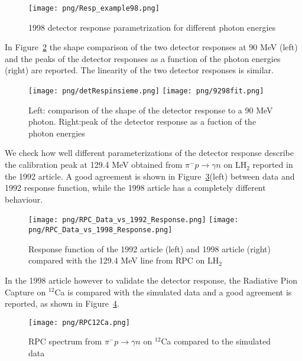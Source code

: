 \begin{figure}[!h]
\centering
\texttt{[image: png/Resp\_example98.png]}
\caption{1998 detector response parametrization for different photon energies}
\label{fig:response98}
\end{figure}

In Figure~\ref{fig:shapecomp} the shape comparison of the two detector responses at 90 MeV (left) and the peaks of the detector responses as a function of the photon energies (right) are reported. The linearity of the two detector responses is similar.

\begin{figure} [!h]
\centering
\texttt{[image: png/detRespinsieme.png]}
\texttt{[image: png/9298fit.png]}
\caption{Left: comparison of the shape of the detector response to a 90 MeV photon. Right:peak of the detector response as a fuction of the photon energies }
\label{fig:shapecomp} 
\end{figure}

We check how well different parameterizations of the detector response describe the 
calibration peak at 129.4 MeV obtained from $\pi^{-}p \rightarrow \gamma n$ on LH$_{2}$ reported in the 1992 article.
A good agreement is shown in Figure~\ref{p004}(left) between data and  1992 response function, while the 1998 article has a completely different behaviour.\\

\begin{figure}[!h]
 \begin{center}
 \texttt{[image: png/RPC\_Data\_vs\_1992\_Response.png]} 
 \texttt{[image: png/RPC\_Data\_vs\_1998\_Response.png]} 
 \end{center}
 \caption{Response function of the 1992 article (left) and 1998 article (right) compared with the 129.4 MeV line from RPC on LH$_{2}$}
 \label{p004}
 \end{figure}

 In the 1998 article  however to validate  the detector response, the Radiative Pion Capture on $^{12}$Ca  is compared with the simulated data and a good agreement is reported, as shown in Figure~\ref{fig:art9}.

\begin{figure}[!h]
 \begin{center}
 \texttt{[image: png/RPC12Ca.png]} 
 \end{center}
 \caption{RPC spectrum from  $\pi^{-}p \rightarrow \gamma n$ on  $^{12}$Ca compared to the simulated data }
 \label{fig:art9}
 \end{figure}
